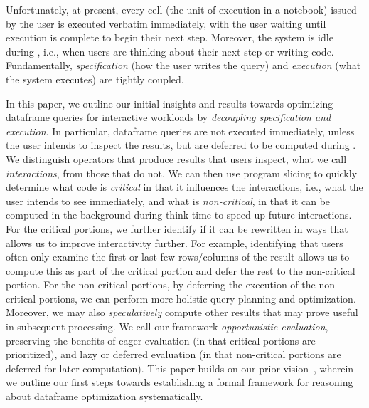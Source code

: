 \newpage
Unfortunately, at present, every cell (the unit of execution
in a notebook) issued by the
user is executed verbatim immediately, 
with the user waiting until execution is complete
to begin their next step. Moreover, the system is idle 
during {\em \thinktime}, i.e., when users are thinking
about their next step or writing code.
Fundamentally, {\em specification} 
(how the user writes the query)
and {\em execution} (what the system executes)
are tightly coupled. 

In this paper, we outline our initial insights and results
towards optimizing dataframe queries for interactive workloads
by {\em decoupling specification and execution}.
In particular, dataframe queries are not executed immediately,
unless the user intends to inspect the results,
but are deferred to be computed during \thinktime. 
We distinguish operators that produce results that users inspect, what we call \emph{interactions}, from those that do not.
We can then use program slicing to quickly determine what code is
{\em critical} in that it influences the interactions, i.e., what the user intends to see immediately,
and what is {\em non-critical}, in that it can be computed in
the background during think-time to speed up future interactions.
For the critical portions, we further identify
if it can be rewritten in ways that allows us to improve
interactivity further. For example, identifying
that users often only examine the first or 
last few rows/columns
of the result allows us to compute this
as part of the critical portion 
and defer the rest to the non-critical portion.
For the non-critical portions, by deferring the execution of the non-critical
portions, we can perform more holistic query planning
and optimization.
Moreover, we may 
also {\em speculatively} compute
other results that may prove useful in subsequent processing.
We call our framework {\em opportunistic evaluation},
preserving the benefits of eager evaluation (in that critical portions
are prioritized), and lazy or deferred evaluation (in that non-critical
portions are deferred for later computation). 
This paper builds on our prior vision~\cite{petersohn13towards},
wherein we outline our first steps towards establishing 
a formal framework for reasoning about dataframe optimization systematically.

